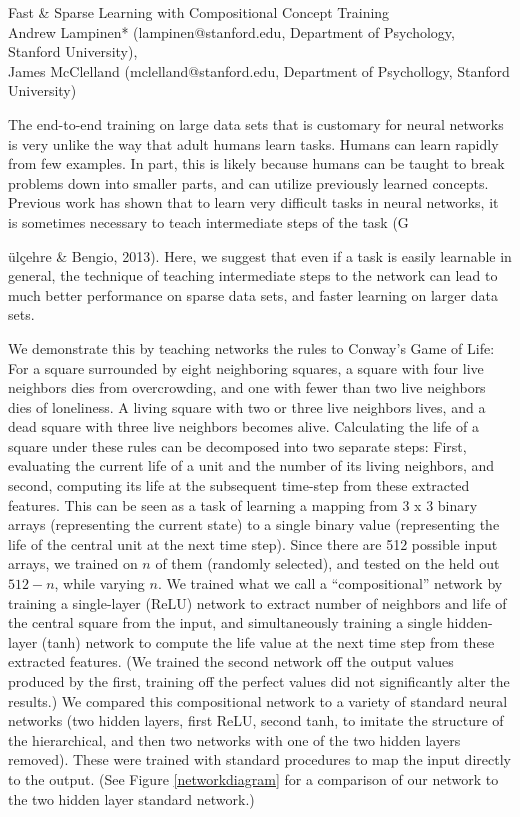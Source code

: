 \documentclass[10pt]{article}
\begin{document}
\begingroup  
  \centering
  \large Fast \& Sparse Learning with Compositional Concept Training\\[1em]
  \small{Andrew Lampinen* (lampinen@stanford.edu, Department of Psychology, Stanford University),\\ James McClelland (mclelland@stanford.edu, Department of Psychollogy, Stanford University)}\par
\endgroup
\vspace{10pt}
The end-to-end training on large data sets that is customary for neural networks is very unlike the way that adult humans learn tasks. Humans can learn rapidly from few examples. In part, this is likely because humans can be taught to break problems down into smaller parts, and can utilize previously learned concepts. Previous work has shown that to learn very difficult tasks in neural networks, it is sometimes necessary to teach intermediate steps of the task (G{\"{u}l\c{c}ehre \& Bengio, 2013). Here, we suggest that even if a task is easily learnable in general, the technique of teaching intermediate steps to the network can lead to much better performance on sparse data sets, and faster learning on larger data sets.\par
We demonstrate this by teaching networks the rules to Conway's Game of Life: For a square surrounded by eight neighboring squares, a square with four live neighbors dies from overcrowding, and one with fewer than two live neighbors dies of loneliness. A living square with two or three live neighbors lives, and a dead square with three live neighbors becomes alive. Calculating the life of a square under these rules can be decomposed into two separate steps: First, evaluating the current life of a unit and the number of its living neighbors, and second, computing its life at the subsequent time-step from these extracted features. This can be seen as a task of learning a mapping from 3 x 3 binary arrays (representing the current state) to a single binary value (representing the life of the central unit at the next time step). Since there are 512 possible input arrays, we trained on $n$ of them (randomly selected), and tested on the held out $512-n$, while varying $n$. We trained what we call a ``compositional'' network by training a single-layer (ReLU) network to extract number of neighbors and life of the central square from the input, and simultaneously training a single hidden-layer (tanh) network to compute the life value at the next time step from these extracted features. (We trained the second network off the output values produced by the first, training off the perfect values did not significantly alter the results.) We compared this compositional network to a variety of standard neural networks (two hidden layers, first ReLU, second tanh, to imitate the structure of the hierarchical, and then two networks with one of the two hidden layers removed). These were trained with standard procedures to map the input directly to the output. (See Figure \ref{networkdiagram} for a comparison of our network to the two hidden layer standard network.)\par
}
\end{document}
